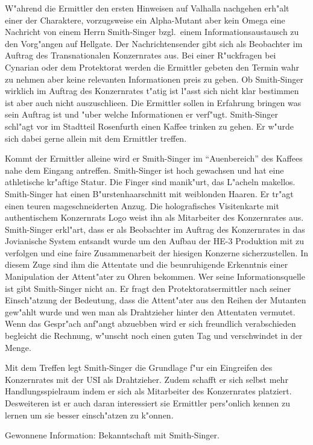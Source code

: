 
W"ahrend die Ermittler den ersten Hinweisen auf Valhalla nachgehen erh"alt einer der Charaktere, vorzugsweise ein Alpha-Mutant aber kein Omega eine Nachricht von einem Herrn Smith-Singer bzgl.~einem Informationsaustausch zu den Vorg"angen auf Hellgate. Der Nachrichtensender gibt sich als Beobachter im Auftrag des Transnationalen Konzernrates aus. Bei einer R"uckfragen bei Cynarian oder dem Protektorat werden die Ermittler gebeten den Termin wahr zu nehmen aber keine relevanten Informationen preis zu geben. Ob Smith-Singer wirklich im Auftrag des Konzernrates t"atig ist l"asst sich nicht klar bestimmen ist aber auch nicht auszuschlie\3en. Die Ermittler sollen in Erfahrung bringen was sein Auftrag ist und "uber welche Informationen er verf"ugt. Smith-Singer schl"agt vor im Stadtteil Rosenfurth einen Kaffee trinken zu gehen. Er w"urde sich dabei gerne allein mit dem Ermittler treffen.

Kommt der Ermittler alleine wird er Smith-Singer im "`Au\3enbereich"' des Kaffees nahe dem Eingang antreffen. Smith-Singer ist hoch gewachsen und hat eine athletische kr"aftige Statur. Die Finger sind manik"urt, das L"acheln makellos. Smith-Singer hat einen B"urstenhaarschnitt mit wei\3blonden Haaren. Er tr"agt einen teuren ma\3geschneiderten Anzug. Die holografisches Visitenkarte mit authentischem Konzernrats Logo weist ihn als Mitarbeiter des Konzernrates aus. Smith-Singer erkl"art, dass er als Beobachter im Auftrag des Konzernrates in das Jovianische System entsandt wurde um den Aufbau der HE-3 Produktion mit zu verfolgen und eine faire Zusammenarbeit der hiesigen Konzerne sicherzustellen. In diesem Zuge sind ihm die Attentate und die beunruhigende Erkenntnis einer Manipulation der Attent"ater zu Ohren bekommen. Wer seine Informationsquelle ist gibt Smith-Singer nicht an. Er fragt den Protektoratsermittler nach seiner Einsch"atzung der Bedeutung, dass die Attent"ater aus den Reihen der Mutanten gew"ahlt wurde und wen man als Drahtzieher hinter den Attentaten vermutet. Wenn das Gespr"ach anf"angt abzuebben wird er sich freundlich verabschieden begleicht die Rechnung, w"unscht noch einen guten Tag und verschwindet in der Menge.

Mit dem Treffen legt Smith-Singer die Grundlage f"ur ein Eingreifen des Konzernrates mit der USI als Drahtzieher. Zudem schafft er sich selbst mehr Handlungsspielraum indem er sich als Mitarbeiter des Konzernrates platziert. Desweiteren ist er auch daran interessiert sie Ermittler pers"onlich kennen zu lernen um sie besser einsch"atzen zu k"onnen.

\begin{remarks}
	Gewonnene Information: Bekanntschaft mit Smith-Singer.	
\end{remarks}
